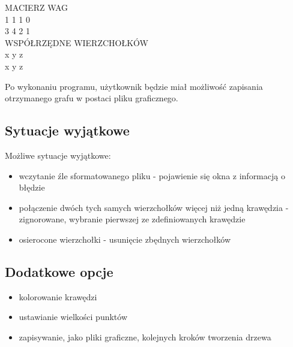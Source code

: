 \documentclass[paper=a4, fontsize=11pt]{scrartcl} %
\numberwithin{equation}{section} %
\numberwithin{figure}{section} %
\numberwithin{table}{section} %
\begin{document}
\begin{center}
MACIERZ WAG \\

1 1 1 0 \\
3 4 2 1 \\

WSPÓŁRZĘDNE WIERZCHOŁKÓW \\
x y z \\
x y z
\end{center}

Po wykonaniu programu, użytkownik będzie miał możliwość zapisania otrzymanego grafu w postaci pliku graficznego.

\subsection{Sytuacje wyjątkowe}   

Możliwe sytuacje wyjątkowe:
\begin{itemize}
\item wczytanie źle sformatowanego pliku - pojawienie się okna z informacją o błędzie
\item połączenie dwóch tych samych wierzchołków więcej niż jedną krawędzia - zignorowane, wybranie pierwszej ze zdefiniowanych krawędzie
\item osierocone wierzchołki - usunięcie zbędnych wierzchołków
\end{itemize}

\subsection{Dodatkowe opcje}   

\begin{itemize}
\item kolorowanie krawędzi
\item ustawianie wielkości punktów
\item zapisywanie, jako pliki graficzne, kolejnych kroków tworzenia drzewa
\end{itemize}
\end{document}
